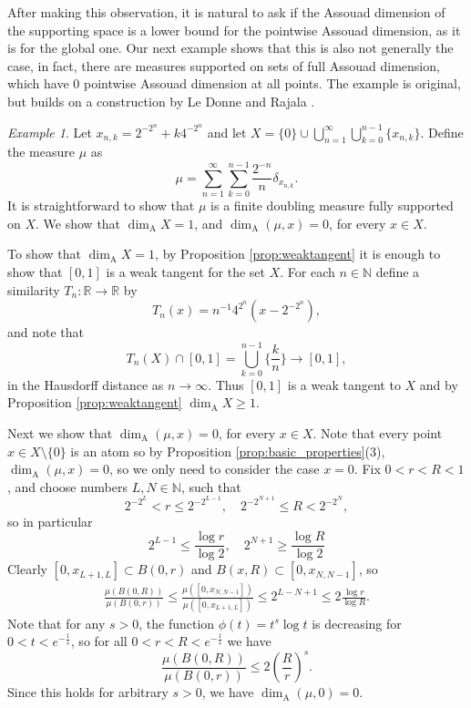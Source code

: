 \documentclass{PRM}
\newcommand{\field}[1]{\mathbb{#1}}
\newcommand{\N}{\field{N}}
\newcommand{\R}{\field{R}}
\theoremstyle{plain}
\theoremstyle{definition}
\theoremstyle{remark}
\newtheorem{example}[thm]{Example}
\begin{document}
After making this observation, it is natural to ask if the Assouad dimension of the supporting space is a lower bound for the pointwise Assouad dimension, as it is for the global one. Our next example shows that this is also not generally the case, in fact, there are measures supported on sets of full Assouad dimension, which have $0$ pointwise Assouad dimension at all points. The example is original, but builds on a construction by Le Donne and Rajala \cite[Example 2.20]{LR}.

\begin{example}
Let $x_{n,k}=2^{-2^n}+k4^{-2^n}$ and let $X=\{0\}\cup\bigcup_{n=1}^{\infty}\bigcup_{k=0}^{n-1}\{x_{n,k}\}$. Define the measure $\mu$ as 
\begin{equation*}
    \mu=\sum_{n=1}^{\infty}\sum_{k=0}^{n-1}\frac{2^{-n}}{n}\delta_{x_{n,k}}.
\end{equation*}
It is straightforward to show that $\mu$ is a finite doubling measure fully supported on $X$. We show that $\dim_{\mathrm{A}}X=1$, and $\dim_{\mathrm{A}}(\mu,x)=0$, for every $x\in X$.

To show that $\dim_{\mathrm{A}}X= 1$, by Proposition \ref{prop:weaktangent} it is enough to show that $[0,1]$ is a weak tangent for the set $X$. For each $n\in\N$ define a similarity $T_n:\R\to \R$ by
\begin{equation*}
    T_n(x)=n^{-1}4^{2^n}(x-2^{-2^n}),
\end{equation*}
and note that
\begin{equation*}
    T_n(X)\cap[0,1]=\bigcup_{k=0}^{n-1}\Big\{\frac{k}{n}\Big\}\to[0,1],
\end{equation*}
in the Hausdorff distance as $n\to\infty$. Thus $[0,1]$ is a weak tangent to $X$ and by Proposition \ref{prop:weaktangent} $\dim_{\mathrm{A}}X\geq 1$.

Next we show that $\dim_{\mathrm{A}}(\mu,x)=0$, for every $x\in X$. Note that every point $x\in X\setminus\{0\}$ is an atom so by Proposition \ref{prop:basic_properties}(3), $\dim_{\mathrm{A}}(\mu,x)=0$, so we only need to consider the case $x=0$. Fix $0<r<R<1$, and choose numbers $L,N\in\N$, such that
\begin{equation*}
    2^{-2^L}< r \leq 2^{-2^{L-1}}, \quad2^{-2^{N+1}}\leq R < 2^{-2^{N}},
\end{equation*}
so in particular
\begin{equation*}
    2^{L-1}\leq\frac{\log r}{\log 2},\quad 2^{N+1}\geq\frac{\log R}{\log 2}
\end{equation*}
Clearly $[0,x_{L+1,L}]\subset B(0,r)$ and $B(x,R)\subset [0,x_{N,N-1}]$, so
\begin{align*}
    \frac{\mu(B(0,R))}{\mu(B(0,r))}\leq\frac{\mu([0,x_{N,N-1}])}{\mu([0,x_{L+1,L}])}\leq 2^{L-N+1}\leq 2\frac{\log r}{\log R}.
\end{align*}
Note that for any $s>0$, the function $\phi(t)=t^s\log t$ is decreasing for  $0<t<e^{-\frac{1}{s}}$, so for all $0<r<R<e^{-\frac{1}{s}}$ we have
\begin{equation*}
    \frac{\mu(B(0,R))}{\mu(B(0,r))}\leq 2\left(\frac{R}{r}\right)^s.
\end{equation*}
Since this holds for arbitrary $s>0$, we have $\dim_{\mathrm{A}}(\mu,0)=0$.
\end{example}
\end{document}
